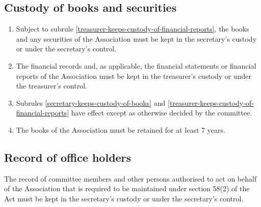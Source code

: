 \documentclass[../constitution.tex]{subfiles}
\begin{document}
\hypertarget{custody-of-books-and-securities}{%
  \subsection{Custody of books and securities}\label{custody-of-books-and-securities}}

\begin{enumerate}

  \item Subject to subrule \ref{treasurer-keeps-custody-of-financial-reports}, the books and any securities of the Association must be kept in the secretary's custody or under the secretary's control. \label{secretary-keeps-custody-of-books}
  \item The financial records and, as applicable, the financial statements or financial reports of the Association must be kept in the treasurer's custody or under the treasurer's control. \label{treasurer-keeps-custody-of-financial-reports}
  \item Subrules \ref{secretary-keeps-custody-of-books} and \ref{treasurer-keeps-custody-of-financial-reports} have effect except as otherwise decided by the committee.
  \item The books of the Association must be retained for at least 7 years.
\end{enumerate}

\hypertarget{record-of-office-holders}{%
  \subsection{Record of office holders}\label{record-of-office-holders}}

The record of committee members and other persons authorised to act on behalf of the Association that is required to be maintained under section 58(2) of the Act must be kept in the secretary's custody or under the secretary's control.

\end{document}
